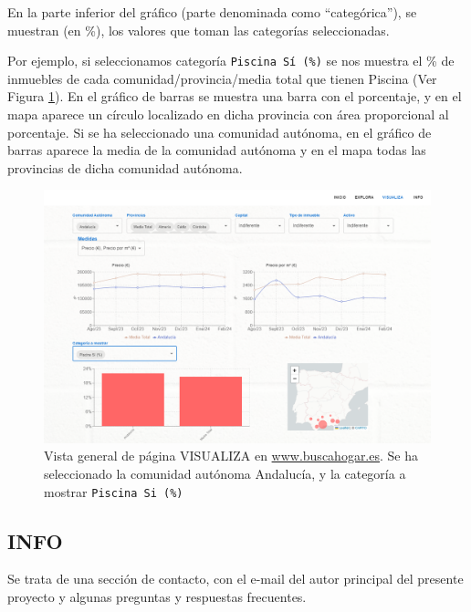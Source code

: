 En la parte inferior del gráfico (parte denominada como ``categórica''), se muestran (en \%), los valores que toman las categorías seleccionadas. 


Por ejemplo, si seleccionamos categoría \texttt{Piscina Sí (\%)} se nos muestra el \% de inmuebles de cada comunidad/provincia/media total que tienen Piscina (Ver Figura \ref{fig:visualiza_1}). En el gráfico de barras se muestra una barra con el porcentaje, y en el mapa aparece un círculo localizado en dicha provincia con área proporcional al porcentaje. Si se ha seleccionado una comunidad autónoma, en el gráfico de barras aparece la media de la comunidad autónoma y en el mapa todas las provincias de dicha comunidad autónoma.


\begin{figure}[ht]
    \centering
	\includegraphics[width=1\textwidth]{img/visualiza_1.PNG}
	\caption[Vista general de página VISUALIZA en \url{www.buscahogar.es}]{Vista general de página VISUALIZA en \url{www.buscahogar.es}. Se ha seleccionado la comunidad autónoma Andalucía, y la categoría a mostrar \texttt{Piscina Si (\%)}}
	\label{fig:visualiza_1}
\end{figure}


\subsection{INFO}{\label{sec:web_info}}

Se trata de una sección de contacto, con el e-mail del autor principal del presente proyecto y algunas preguntas y respuestas frecuentes.

